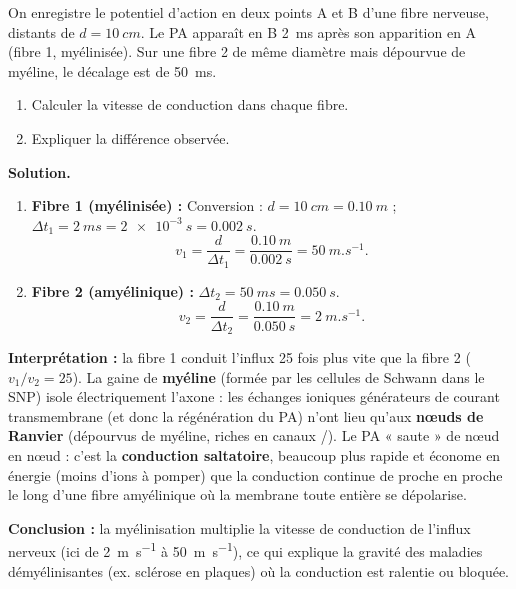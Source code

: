 \documentclass[11pt]{article}
\begin{document}
\begin{exoresolu}
On enregistre le potentiel d'action en deux points A et B d'une fibre nerveuse, distants de $d = \SI{10}{cm}$. Le PA apparaît en B \SI{2}{ms} après son apparition en A (fibre 1, myélinisée). Sur une fibre 2 de même diamètre mais dépourvue de myéline, le décalage est de \SI{50}{ms}.
\begin{enumerate}
\item Calculer la vitesse de conduction dans chaque fibre.
\item Expliquer la différence observée.
\end{enumerate}
\tcblower
\textbf{Solution.}
\begin{enumerate}
\item \textbf{Fibre 1 (myélinisée) :}
Conversion : $d = \SI{10}{cm} = \SI{0,10}{m}$ ; $\Delta t_1 = \SI{2}{ms} = \SI{2e-3}{s} = \SI{0,002}{s}$.
\[ v_1 = \frac{d}{\Delta t_1} = \frac{\SI{0,10}{m}}{\SI{0,002}{s}} = \SI{50}{m.s^{-1}}. \]
\item \textbf{Fibre 2 (amyélinique) :}
$\Delta t_2 = \SI{50}{ms} = \SI{0,050}{s}$.
\[ v_2 = \frac{d}{\Delta t_2} = \frac{\SI{0,10}{m}}{\SI{0,050}{s}} = \SI{2}{m.s^{-1}}. \]
\end{enumerate}
\textbf{Interprétation :} la fibre 1 conduit l'influx 25 fois plus vite que la fibre 2 ($v_1/v_2 = 25$). La gaine de \textbf{myéline} (formée par les cellules de Schwann dans le SNP) isole électriquement l'axone : les échanges ioniques générateurs de courant transmembrane (et donc la régénération du PA) n'ont lieu qu'aux \textbf{nœuds de Ranvier} (dépourvus de myéline, riches en canaux /). Le PA « saute » de nœud en nœud : c'est la \textbf{conduction saltatoire}, beaucoup plus rapide et économe en énergie (moins d'ions à pomper) que la conduction continue de proche en proche le long d'une fibre amyélinique où la membrane toute entière se dépolarise.

\textbf{Conclusion :} la myélinisation multiplie la vitesse de conduction de l'influx nerveux (ici de \SI{2}{m.s^{-1}} à \SI{50}{m.s^{-1}}), ce qui explique la gravité des maladies démyélinisantes (ex. sclérose en plaques) où la conduction est ralentie ou bloquée.
\end{exoresolu}
\end{document}

